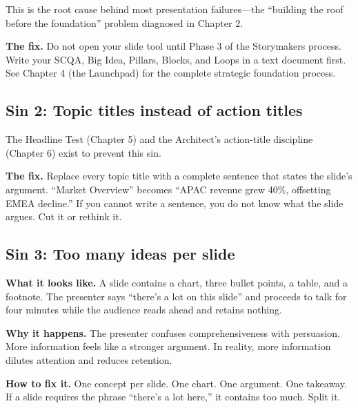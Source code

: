 This is the root cause behind most presentation failures---the ``building the roof before the foundation'' problem diagnosed in Chapter 2.

\textbf{The fix.} Do not open your slide tool until Phase 3 of the Storymakers process. Write your SCQA, Big Idea, Pillars, Blocks, and Loops in a text document first. See Chapter 4 (the Launchpad) for the complete strategic foundation process.


\subsection{Sin 2: Topic titles instead of action titles}

The Headline Test (Chapter 5) and the Architect's action-title discipline (Chapter 6) exist to prevent this sin.

\textbf{The fix.} Replace every topic title with a complete sentence that states the slide's argument. ``Market Overview'' becomes ``APAC revenue grew 40\%, offsetting EMEA decline.'' If you cannot write a sentence, you do not know what the slide argues. Cut it or rethink it.


\subsection{Sin 3: Too many ideas per slide}

\textbf{What it looks like.} A slide contains a chart, three bullet points, a table, and a footnote. The presenter says ``there's a lot on this slide'' and proceeds to talk for four minutes while the audience reads ahead and retains nothing.

\textbf{Why it happens.} The presenter confuses comprehensiveness with persuasion. More information feels like a stronger argument. In reality, more information dilutes attention and reduces retention.

\textbf{How to fix it.} One concept per slide. One chart. One argument. One takeaway. If a slide requires the phrase ``there's a lot here,'' it contains too much. Split it.

